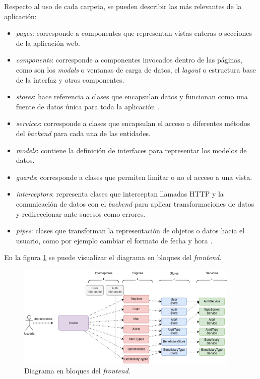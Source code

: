 Respecto al uso de cada carpeta, se pueden describir las más relevantes de la aplicación:
\begin{itemize}
	\item \textit{pages}: corresponde a componentes que representan vistas enteras o secciones de la aplicación web.
	\item \textit{components}: corresponde a componentes invocados dentro de las páginas, como son los \textit{modals} o ventanas de carga de datos, el \textit{layout} o estructura base de la interfaz y otros componentes.
	\item \textit{stores}: hace referencia a clases que encapsulan datos y funcionan como una fuente de datos única para toda la aplicación \citep{NGRX:1}.
	\item \textit{services}: corresponde a clases que encapsulan el acceso a diferentes métodos del \textit{backend} para cada una de las entidades.
	\item \textit{models}: contiene la definición de interfaces para representar los modelos de datos.
	\item \textit{guards}: corresponde a clases que permiten limitar o no el acceso a una vista.
	\item \textit{interceptors}:	representa clases que interceptan llamadas HTTP y la comunicación de datos con el \textit{backend} para aplicar transformaciones de datos y redireccionar ante sucesos como errores.
	\item \textit{pipes}: clases que transforman la representación de objetos o datos hacia el usuario, como por ejemplo cambiar el formato de fecha y hora \citep{ANGULAR:5}.
\end{itemize}

En la figura \ref{frontend:esquema} se puede visualizar el diagrama en bloques del \textit{frontend}.
\begin{figure}[H]
	\centering
	\includegraphics[width=0.95\textwidth]{./Figures/frontend-esquema.png}
	\caption{Diagrama en bloques del \textit{frontend}.}
	\label{frontend:esquema}
\end{figure}


